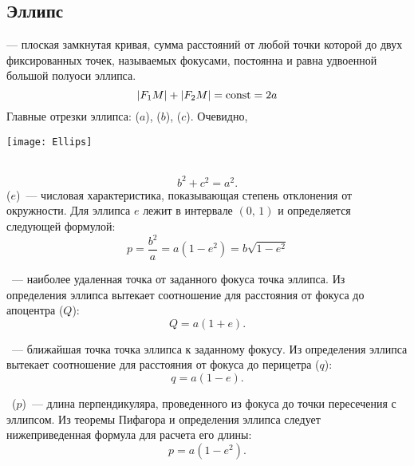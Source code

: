 \subsection{Эллипс}
\begin{minipage}{0.5\tw}
{\bfseries {}} --- плоская замкнутая кривая, сумма расстояний от любой точки которой до двух фиксированных точек, называемых фокусами, постоянна и равна удвоенной большой полуоси эллипса.
\begin{equation}
|F_1 M|+|F_2M|=\operatorname{const}=2a
\end{equation}	
Главные отрезки эллипса:  ($a$),  ($b$),  ($c$). Очевидно,
\end{minipage}
\begin{minipage}{0.5\tw}
	\begin{flushright}
		\vspace{-.5pc}
		\texttt{[image: Ellips]}
	\end{flushright}
\end{minipage}\\
\begin{equation}
	b^2 + c^2 = a^2.
\end{equation}
 ($e$)~--- числовая 
характеристика, показывающая степень отклонения от 
окружности. Для эллипса $e$ лежит в интервале $(0, \, 1)$ и
определяется следующей формулой:\begin{equation}
p=\frac{b^2}{a}=a(1-e^2)=b\sqrt{1-e^2}
\end{equation}

~--- наиболее удаленная точка
от заданного фокуса точка эллипса. Из определения эллипса
вытекает соотношение для расстояния от фокуса до 
апоцентра ($Q$):\begin{equation}
Q = a (1 + e).
\end{equation}

~--- ближайшая точка
точка эллипса к заданному фокусу. Из определения эллипса
вытекает соотношение для расстояния от фокуса до 
перицетра ($q$):\begin{equation}
q = a (1 - e).
\end{equation}

~($p$)~--- длина перпендикуляра,
проведенного из фокуса до точки пересечения с эллипсом.
Из теоремы Пифагора и определения эллипса следует 
нижеприведенная формула для расчета его длины:
\begin{equation}
p = a(1 - e^2).
\end{equation}


